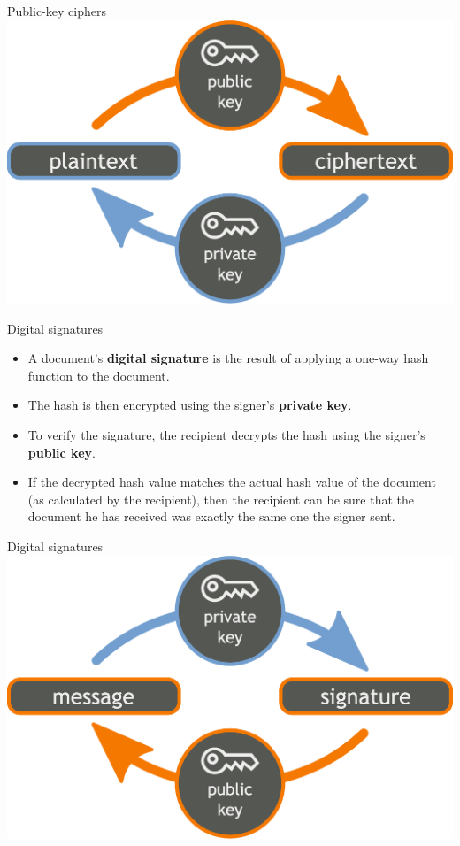 \documentclass[
mode=present,
paper=smartboard,
size=20pt,
]{powerdot}
\begin{document}
\begin{slide}[toc=]{Public-key ciphers}
\centering\includegraphics[width=0.9\linewidth]{images/Orange_blue_public_key_cryptography_en.eps}
\end{slide}

\begin{slide}{Digital signatures}
  \begin{itemize}
  \item A document's \textbf{digital signature} is the result of
    applying a one-way hash function to the document.
  \item The hash is then encrypted using the signer's \textbf{private
      key}.
  \item To verify the signature, the recipient decrypts the hash using
    the signer's \textbf{public key}.
  \item If the decrypted hash value matches the actual hash value of
    the document (as calculated by the recipient), then the recipient
    can be sure that the document he has received was exactly the same
    one the signer sent.
  \end{itemize}
\end{slide}

\begin{slide}[toc=]{Digital signatures}
\centering\includegraphics[width=0.9\linewidth]{images/Orange_blue_digital_signature_en.eps}
\end{slide}
\end{document}
